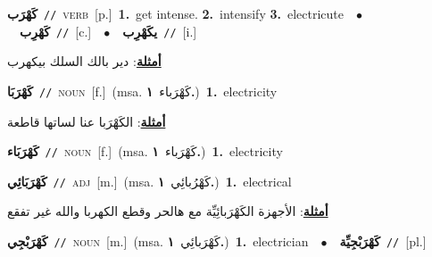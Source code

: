 \documentclass[10pt,a4paper,twoside]{article} %
\begin{document}
\begin{multicols}{2}
{\setlength\topsep{0pt}\textbf{\foreignlanguage{arabic}{كَهْرَب}}\ {\color{gray}\texttt{//}\color{black}}\ \textsc{verb}\ [p.]\ \textbf{1.}~get intense.  \textbf{2.}~intensify  \textbf{3.}~electricute\ \ $\bullet$\ \ \setlength\topsep{0pt}\textbf{\foreignlanguage{arabic}{كَهْرِب}}\ {\color{gray}\texttt{//}\color{black}}\ [c.]\ \ $\bullet$\ \ \setlength\topsep{0pt}\textbf{\foreignlanguage{arabic}{يكَهْرِب}}\ {\color{gray}\texttt{//}\color{black}}\ [i.]\  \begin{flushright}\color{gray}\foreignlanguage{arabic}{\textbf{\underline{\foreignlanguage{arabic}{أمثلة}}}: دير بالك السلك بيكهرب}\end{flushright}\color{black}} \vspace{2mm}

{\setlength\topsep{0pt}\textbf{\foreignlanguage{arabic}{كَهْرَبَا}}\ {\color{gray}\texttt{//}\color{black}}\ \textsc{noun}\ [f.]\ \color{gray}(msa. \foreignlanguage{arabic}{كَهْرَباء}~\foreignlanguage{arabic}{\textbf{١.}})\color{black}\ \textbf{1.}~electricity\  \begin{flushright}\color{gray}\foreignlanguage{arabic}{\textbf{\underline{\foreignlanguage{arabic}{أمثلة}}}: الكَهْرَبا عنا لساتها قاطعة}\end{flushright}\color{black}} \vspace{2mm}

{\setlength\topsep{0pt}\textbf{\foreignlanguage{arabic}{كَهْرَبَاء}}\ {\color{gray}\texttt{//}\color{black}}\ \textsc{noun}\ [f.]\ \color{gray}(msa. \foreignlanguage{arabic}{كَهْرَباء}~\foreignlanguage{arabic}{\textbf{١.}})\color{black}\ \textbf{1.}~electricity\ } \vspace{2mm}

{\setlength\topsep{0pt}\textbf{\foreignlanguage{arabic}{كَهْرَبَائِي}}\ {\color{gray}\texttt{//}\color{black}}\ \textsc{adj}\ [m.]\ \color{gray}(msa. \foreignlanguage{arabic}{كَهْرُبائِي}~\foreignlanguage{arabic}{\textbf{١.}})\color{black}\ \textbf{1.}~electrical\  \begin{flushright}\color{gray}\foreignlanguage{arabic}{\textbf{\underline{\foreignlanguage{arabic}{أمثلة}}}: الأجهزة الكَهْرَبائِيِّة مع هالحر وقطع الكهربا والله غير تفقع}\end{flushright}\color{black}} \vspace{2mm}

{\setlength\topsep{0pt}\textbf{\foreignlanguage{arabic}{كَهْرَبْجِي}}\ {\color{gray}\texttt{//}\color{black}}\ \textsc{noun}\ [m.]\ \color{gray}(msa. \foreignlanguage{arabic}{كَهْرَبائِي}~\foreignlanguage{arabic}{\textbf{١.}})\color{black}\ \textbf{1.}~electrician\ \ $\bullet$\ \ \setlength\topsep{0pt}\textbf{\foreignlanguage{arabic}{كَهْرَبْجِيِّة}}\ {\color{gray}\texttt{//}\color{black}}\ [pl.]\ } \vspace{2mm}


\end{multicols}
\end{document}
